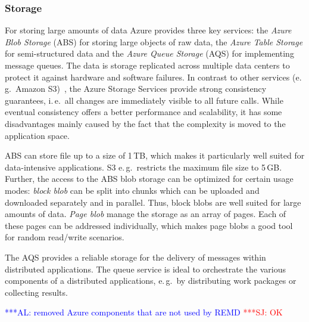 \documentclass[conference,final]{IEEEtran}
\newcommand{\alnote}[1]{ {\textcolor{blue} { ***AL: #1 }}}
\newcommand{\jhanote}[1]{ {\textcolor{red} { ***SJ: #1 }}}
\newcommand{\alnote}[1]{}
\newcommand{\jhanote}[1]{}
\begin{document}
\subsubsection{Storage}

For storing large amounts of data Azure provides
three key services: the \emph{Azure Blob Storage} (ABS) for storing large
objects of raw data, the \emph{Azure Table Storage} for
semi-structured data and the \emph{Azure Queue Storage} (AQS) for
implementing message queues.  The data is storage replicated across
multiple data centers to protect it against hardware and software
failures. In contrast to other services (e.\,g.\ Amazon S3)~\cite{1294281}, the
Azure Storage Services provide strong consistency guarantees, i.\,e.\
all changes are immediately visible to all future calls. While
eventual consistency offers a better performance and scalability, 
it has some disadvantages mainly caused by the fact that the 
complexity is moved to the application space.

ABS can store file up to a size of 1\,TB, which makes it
particularly well suited for data-intensive applications. S3
e.\,g.\ restricts the maximum file size to 5\,GB. Further, the
access to the ABS blob storage can be optimized for certain usage modes:
\emph{block blob} can be split into chunks which can be uploaded and
downloaded separately and in parallel.  Thus, block blobs are well
suited for large amounts of data. \emph{Page
  blob} manage the storage as an array of pages. Each of these pages
can be addressed individually, which makes page blobs a good tool for
random read/write scenarios. 


The AQS provides a reliable storage for the delivery
of messages within distributed applications.  The queue service is
ideal to orchestrate the various components of a distributed
applications, e.\,g.\ by distributing work packages or collecting
results. 

\alnote{removed Azure components that are not used by
  REMD}\jhanote{OK}
\end{document}
